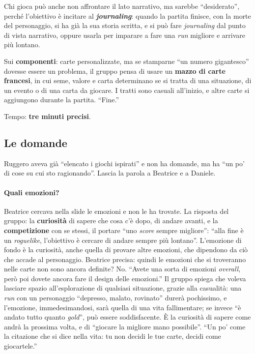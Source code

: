 Chi gioca può anche non affrontare il lato narrativo, ma sarebbe ``desiderato'', perché
l'obiettivo è incitare al \textbf{\emph{journaling}}: quando la partita finisce, con la
morte del personaggio, si ha già la sua storia scritta, e si può fare
\emph{journaling} dal punto di vista narrativo, oppure usarla per imparare a fare una
\emph{run} migliore e arrivare più lontano.

Sui \textbf{componenti}: carte personalizzate, ma se stamparne ``un numero gigantesco''
dovesse essere un problema, il gruppo pensa di usare un \textbf{mazzo di carte
francesi}, in cui seme, valore e carta determinano se si tratta di una situazione, di un
evento o di una carta da giocare. I tratti sono casuali all'inizio, e altre carte si
aggiungono durante la partita. ``Fine.''

Tempo: \textbf{tre minuti precisi}.

\subsection{Le domande}

Ruggero aveva già ``elencato i giochi ispirati'' e non ha domande, ma ha ``un po' di cose
su cui sto ragionando''. Lascia la parola a Beatrice e a Daniele.

\paragraph{Quali emozioni?} Beatrice cercava nella slide le emozioni e non le ha trovate.
La risposta del gruppo: la \textbf{curiosità} di sapere che cosa c'è dopo, di andare
avanti, e la \textbf{competizione} con se stessi, il portare ``uno \emph{score} sempre
migliore'': ``alla fine è un \emph{roguelike}, l'obiettivo è cercare di andare sempre più
lontano''. L'emozione di fondo è la curiosità, anche quella di provare altre emozioni,
che dipendono da ciò che accade al personaggio. Beatrice precisa: quindi le emozioni che
si troveranno nelle carte non sono ancora definite? No. ``Avete una sorta di emozioni
\emph{overall}, però poi dovete ancora fare il design delle emozioni.'' Il gruppo
spiega che voleva lasciare spazio all'esplorazione di qualsiasi situazione, grazie alla
casualità: una \emph{run} con un personaggio ``depresso, malato, rovinato'' durerà
pochissimo, e l'emozione, immedesimandosi, sarà quella di una vita fallimentare; se
invece ``è andato tutto quanto \emph{gold}'', può essere soddisfacente. È la curiosità
di sapere come andrà la prossima volta, e di ``giocare la migliore mano possibile''. ``Un
po' come la citazione che si dice nella vita: tu non decidi le tue carte, decidi come
giocartele.''

